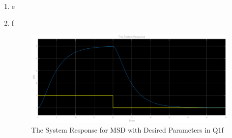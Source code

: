 \documentclass[a4paper,12pt]{article}
\begin{document}
\begin{enumerate}
\begin{enumerate}
			\item 	e
				
				
				
			
			
			\item 	f
			
				\begin{figure}[H]
					\center
					\setlength{\unitlength}{\textwidth} 
					\includegraphics[width=0.8\unitlength]{images/1f}
					\caption{\label{fig:1f} The System Response for MSD with Desired Parameters in Q1f  }
				\end{figure}
				

\end{enumerate}
\end{enumerate}
\end{document}
